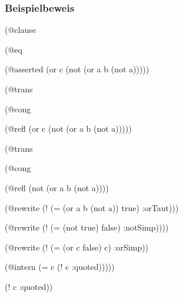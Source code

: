 \documentclass[a4paper]{article}
\begin{document}
\subsubsection{Beispielbeweis}

\begin{list}{\bf Zeile :}{\it}
\item (@clause
\item \hspace*{5mm}(@eq
\item \hspace*{10mm}(@asserted (or c (not (or a b (not a)))))
\item \hspace*{10mm}(@trans
\item \hspace*{15mm}(@cong
\item \hspace*{20mm}(@refl (or c (not (or a b (not a)))))
\item \hspace*{20mm}(@trans
\item \hspace*{25mm}(@cong
\item \hspace*{30mm}(@refl (not (or a b (not a))))
\item \hspace*{28.5mm}(@rewrite (! (= (or a b (not a)) true) :orTaut)))
\item \hspace*{23.5mm}(@rewrite (! (= (not true) false) :notSimp))))
\item \hspace*{12.5mm}(@rewrite (! (= (or c false) c) :orSimp))
\item \hspace*{12.5mm}(@intern (= c (! c :quoted)))))
\item \hspace*{2.5mm}(! c :quoted))
\end{list}
\end{document}
